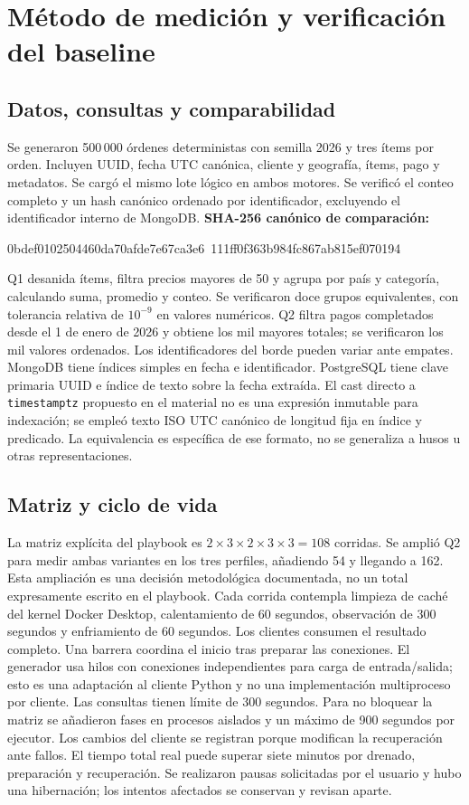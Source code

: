 \documentclass[11pt,letterpaper]{article}
\begin{document}
\section{Método de medición y verificación del baseline}
\subsection{Datos, consultas y comparabilidad}
Se generaron 500\,000 órdenes deterministas con semilla 2026 y tres ítems por orden. Incluyen UUID, fecha UTC canónica, cliente y geografía, ítems, pago y metadatos. Se cargó el mismo lote lógico en ambos motores. Se verificó el conteo completo y un hash canónico ordenado por identificador, excluyendo el identificador interno de MongoDB.
\textbf{SHA-256 canónico de comparación:} \par{\footnotesize\ttfamily 0bdef0102504460da70afde7e67ca3e6\ 111ff0f363b984fc867ab815ef070194}\par
Q1 desanida ítems, filtra precios mayores de 50 y agrupa por país y categoría, calculando suma, promedio y conteo. Se verificaron doce grupos equivalentes, con tolerancia relativa de $10^{-9}$ en valores numéricos. Q2 filtra pagos completados desde el 1 de enero de 2026 y obtiene los mil mayores totales; se verificaron los mil valores ordenados. Los identificadores del borde pueden variar ante empates.
MongoDB tiene índices simples en fecha e identificador. PostgreSQL tiene clave primaria UUID e índice de texto sobre la fecha extraída. El cast directo a \texttt{timestamptz} propuesto en el material no es una expresión inmutable para indexación; se empleó texto ISO UTC canónico de longitud fija en índice y predicado. La equivalencia es específica de ese formato, no se generaliza a husos u otras representaciones.
\subsection{Matriz y ciclo de vida}
La matriz explícita del playbook es $2\times3\times2\times3\times3=108$ corridas. Se amplió Q2 para medir ambas variantes en los tres perfiles, añadiendo 54 y llegando a 162. Esta ampliación es una decisión metodológica documentada, no un total expresamente escrito en el playbook.
Cada corrida contempla limpieza de caché del kernel Docker Desktop, calentamiento de 60 segundos, observación de 300 segundos y enfriamiento de 60 segundos. Los clientes consumen el resultado completo. Una barrera coordina el inicio tras preparar las conexiones. El generador usa hilos con conexiones independientes para carga de entrada/salida; esto es una adaptación al cliente Python y no una implementación multiproceso por cliente.
Las consultas tienen límite de 300 segundos. Para no bloquear la matriz se añadieron fases en procesos aislados y un máximo de 900 segundos por ejecutor. Los cambios del cliente se registran porque modifican la recuperación ante fallos. El tiempo total real puede superar siete minutos por drenado, preparación y recuperación. Se realizaron pausas solicitadas por el usuario y hubo una hibernación; los intentos afectados se conservan y revisan aparte.
\end{document}
